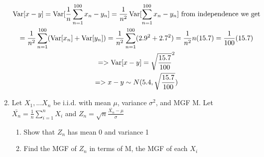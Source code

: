 \documentclass[11pt]{article}
\newcommand{\Var}{\mathop{\rm Var}}
\begin{document}
\begin{enumerate}
\begin{gather}
	\Var[x-y] = \Var[\frac{1}{n}\sum_{n=1}^{100} x_n-y_n] =\frac{1}{n^2}\Var[\sum_{n=1}^{100} x_n-y_n] \text{ from independence we get}\\
	= \frac{1}{n^2}\sum_{n=1}^{100} (\Var[x_n]+\Var[y_n]) = \frac{1}{n^2}\sum_{n=1}^{100} (2.9^2+2.7^2) = \frac{1}{n^2}n (15.7) = \frac{1}{100}(15.7) \\
	=> \Var[x-y] = \sqrt{\frac{15.7}{100}}^2\\
	=>
	x-y \sim N(5.4,\sqrt{\frac{15.7}{100}})
\end{gather}
\item Let $X_1,...X_n$ be i.i.d. with mean $\mu$, variance $\sigma^2$, and MGF M. Let \\
 $\bar{X_n}=\frac{1}{n}\sum_{i=1}^{n} X_i$ 
 and
 $Z_n = \sqrt{n}\frac{\bar{X_n}-\mu}{\sigma}$
\begin{enumerate}
	\item Show that $Z_n$ has mean 0 and variance 1
	\item Find the MGF of $Z_n$ in terms of M, the MGF of each $X_i$
\end{enumerate}
\end{enumerate}
\end{document}
